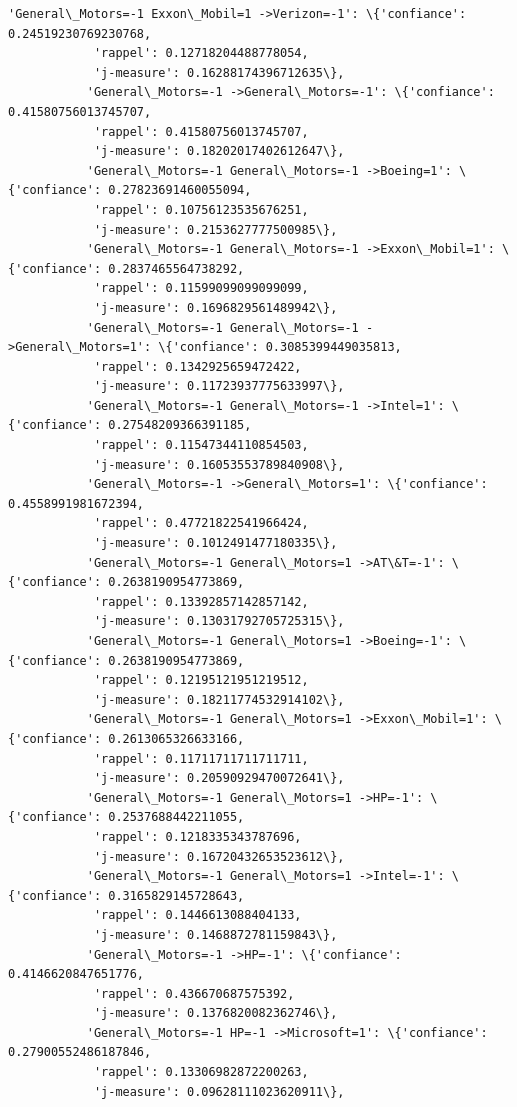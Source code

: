 \documentclass[11pt]{article}
\begin{document}
\begin{Verbatim}[commandchars=\\\{\}]
           'General\_Motors=-1 Exxon\_Mobil=1 ->Verizon=-1': \{'confiance': 0.24519230769230768,
            'rappel': 0.12718204488778054,
            'j-measure': 0.16288174396712635\},
           'General\_Motors=-1 ->General\_Motors=-1': \{'confiance': 0.41580756013745707,
            'rappel': 0.41580756013745707,
            'j-measure': 0.18202017402612647\},
           'General\_Motors=-1 General\_Motors=-1 ->Boeing=1': \{'confiance': 0.27823691460055094,
            'rappel': 0.10756123535676251,
            'j-measure': 0.2153627777500985\},
           'General\_Motors=-1 General\_Motors=-1 ->Exxon\_Mobil=1': \{'confiance': 0.2837465564738292,
            'rappel': 0.11599099099099099,
            'j-measure': 0.1696829561489942\},
           'General\_Motors=-1 General\_Motors=-1 ->General\_Motors=1': \{'confiance': 0.3085399449035813,
            'rappel': 0.1342925659472422,
            'j-measure': 0.11723937775633997\},
           'General\_Motors=-1 General\_Motors=-1 ->Intel=1': \{'confiance': 0.27548209366391185,
            'rappel': 0.11547344110854503,
            'j-measure': 0.16053553789840908\},
           'General\_Motors=-1 ->General\_Motors=1': \{'confiance': 0.4558991981672394,
            'rappel': 0.47721822541966424,
            'j-measure': 0.1012491477180335\},
           'General\_Motors=-1 General\_Motors=1 ->AT\&T=-1': \{'confiance': 0.2638190954773869,
            'rappel': 0.13392857142857142,
            'j-measure': 0.13031792705725315\},
           'General\_Motors=-1 General\_Motors=1 ->Boeing=-1': \{'confiance': 0.2638190954773869,
            'rappel': 0.12195121951219512,
            'j-measure': 0.18211774532914102\},
           'General\_Motors=-1 General\_Motors=1 ->Exxon\_Mobil=1': \{'confiance': 0.2613065326633166,
            'rappel': 0.11711711711711711,
            'j-measure': 0.20590929470072641\},
           'General\_Motors=-1 General\_Motors=1 ->HP=-1': \{'confiance': 0.2537688442211055,
            'rappel': 0.1218335343787696,
            'j-measure': 0.16720432653523612\},
           'General\_Motors=-1 General\_Motors=1 ->Intel=-1': \{'confiance': 0.3165829145728643,
            'rappel': 0.1446613088404133,
            'j-measure': 0.1468872781159843\},
           'General\_Motors=-1 ->HP=-1': \{'confiance': 0.4146620847651776,
            'rappel': 0.436670687575392,
            'j-measure': 0.1376820082362746\},
           'General\_Motors=-1 HP=-1 ->Microsoft=1': \{'confiance': 0.27900552486187846,
            'rappel': 0.13306982872200263,
            'j-measure': 0.09628111023620911\},

\end{Verbatim}
\end{document}
